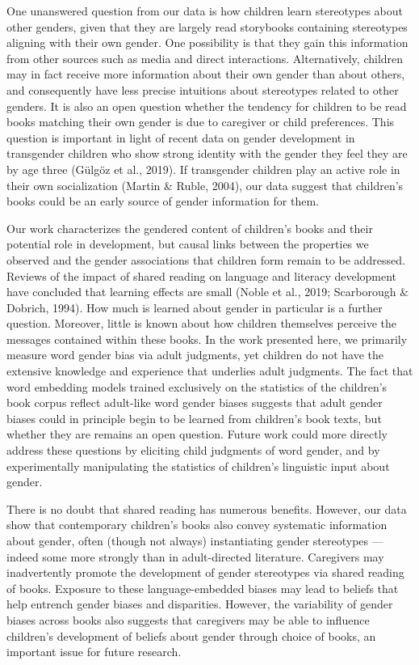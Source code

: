 \documentclass[
  english,
  ,man,floatsintext]{apa6}
\begin{document}
One unanswered question from our data is how children learn stereotypes about other genders, given that they are largely read storybooks containing stereotypes aligning with their own gender. One possibility is that they gain this information from other sources such as media and direct interactions. Alternatively, children may in fact receive more information about their own gender than about others, and consequently have less precise intuitions about stereotypes related to other genders. It is also an open question whether the tendency for children to be read books matching their own gender is due to caregiver or child preferences. This question is important in light of recent data on gender development in transgender children who show strong identity with the gender they feel they are by age three (Gülgöz et al., 2019). If transgender children play an active role in their own socialization (Martin \& Ruble, 2004), our data suggest that children's books could be an early source of gender information for them.

Our work characterizes the gendered content of children's books and their potential role in development, but causal links between the properties we observed and the gender associations that children form remain to be addressed. Reviews of the impact of shared reading on language and literacy development have concluded that learning effects are small (Noble et al., 2019; Scarborough \& Dobrich, 1994). How much is learned about gender in particular is a further question. Moreover, little is known about how children themselves perceive the messages contained within these books. In the work presented here, we primarily measure word gender bias via adult judgments, yet children do not have the extensive knowledge and experience that underlies adult judgments. The fact that word embedding models trained exclusively on the statistics of the children's book corpus reflect adult-like word gender biases suggests that adult gender biases could in principle begin to be learned from children's book texts, but whether they are remains an open question. Future work could more directly address these questions by eliciting child judgments of word gender, and by experimentally manipulating the statistics of children's linguistic input about gender.

There is no doubt that shared reading has numerous benefits. However, our data show that contemporary children's books also convey systematic information about gender, often (though not always) instantiating gender stereotypes --- indeed some more strongly than in adult-directed literature. Caregivers may inadvertently promote the development of gender stereotypes via shared reading of books. Exposure to these language-embedded biases may lead to beliefs that help entrench gender biases and disparities. However, the variability of gender biases across books also suggests that caregivers may be able to influence children's development of beliefs about gender through choice of books, an important issue for future research.
\end{document}
